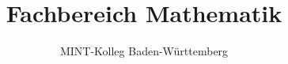 %
%


\title{Fachbereich Mathematik}
\author{MINT-Kolleg Baden-W\"urttemberg}



\MSetSubject{\MINTMathematics}



\MPrintIndex



